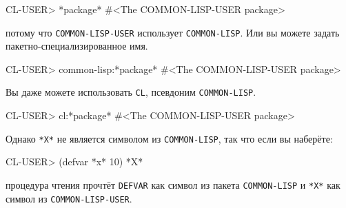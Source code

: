 \begin{myverb}
CL-USER> *package*
#<The COMMON-LISP-USER package>
\end{myverb}

\noindent{}потому что \lstinline{COMMON-LISP-USER} использует \lstinline{COMMON-LISP}. Или вы можете задать
пакетно-специализированное имя.

\begin{myverb}
CL-USER> common-lisp:*package*
#<The COMMON-LISP-USER package>
\end{myverb}

Вы даже можете использовать \lstinline{CL}, псевдоним \lstinline{COMMON-LISP}.

\begin{myverb}
CL-USER> cl:*package*
#<The COMMON-LISP-USER package>
\end{myverb}

Однако \lstinline{*X*} не является символом из \lstinline{COMMON-LISP}, так что если вы наберёте:

\begin{myverb}
CL-USER> (defvar *x* 10)
*X*
\end{myverb}

\noindent{}процедура чтения прочтёт \lstinline{DEFVAR} как символ из пакета \lstinline{COMMON-LISP} и \lstinline{*X*}
как символ из \lstinline{COMMON-LISP-USER}.

